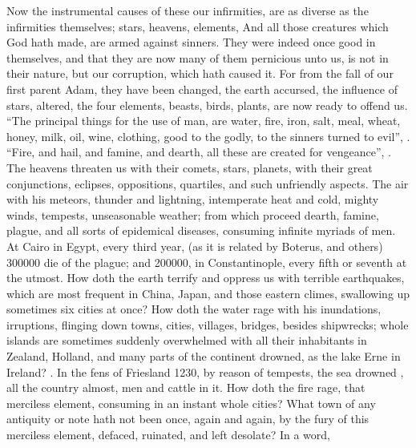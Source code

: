 Now the instrumental causes of these our infirmities, are as diverse as the
infirmities themselves; stars, heavens, elements, \etc{} And all those
creatures which God hath made, are armed against sinners. They were indeed once
good in themselves, and that they are now many of them pernicious unto us, is
not in their nature, but our corruption, which hath caused it. For from the
fall of our first parent Adam, they have been changed, the earth accursed, the
influence of stars, altered, the four elements, beasts, birds, plants, are now
ready to offend us. \enquote{The principal things for the use of man, are water, fire,
iron, salt, meal, wheat, honey, milk, oil, wine, clothing, good to the godly,
to the sinners turned to evil}, . \enquote{Fire, and
hail, and famine, and dearth, all these are created for vengeance},
. The heavens threaten us with their comets,
stars, planets, with their great conjunctions, eclipses, oppositions,
quartiles, and such unfriendly aspects. The air with his meteors, thunder and
lightning, intemperate heat and cold, mighty winds, tempests, unseasonable
weather; from which proceed dearth, famine, plague, and all sorts of epidemical
diseases, consuming infinite myriads of men. At Cairo in Egypt, every third
year, (as it is related by Boterus, and others)
300\thinspace{}000 die of the plague; and 200\thinspace{}000, in
Constantinople, every fifth or seventh at the utmost. How doth the earth
terrify and oppress us with terrible earthquakes, which are most frequent in
China, Japan, and those eastern climes, swallowing up
sometimes six cities at once? How doth the water rage with his inundations,
irruptions, flinging down towns, cities, villages, bridges, \etc{} besides
shipwrecks; whole islands are sometimes suddenly overwhelmed with all their
inhabitants in Zealand, Holland, and many parts of the
continent drowned, as the lake Erne in Ireland?
. In the fens of Friesland
1230, by reason of tempests, the sea drowned , all the country almost, men and cattle
in it. How doth the fire rage, that merciless element, consuming in an instant
whole cities? What town of any antiquity or note hath not been once, again and
again, by the fury of this merciless element, defaced, ruinated, and left
desolate? In a word,


